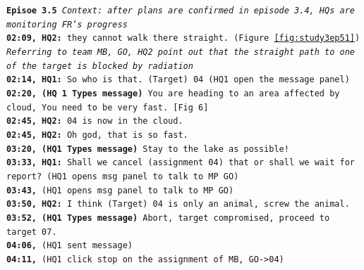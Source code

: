 \noindent\texttt{\textbf{Episoe 3.5}
\emph{Context: after plans are confirmed in episode 3.4, HQs are monitoring FR's progress}\\
\textbf{02:09, HQ2:} they cannot walk there straight. (Figure \ref{fig:study3ep51})\\
\emph{Referring to team MB, GO, HQ2 point out that the straight path to one of the target is blocked by radiation}\\
\textbf{02:14, HQ1:} So who is that. (Target) 04 (HQ1 open the message panel) \\
\textbf{02:20, (HQ 1 Types message)}  You are heading to an area affected by cloud, You need to be very fast. [Fig 6] \\
\textbf{02:45, HQ2:} 04 is now in the cloud. \\
\textbf{02:45, HQ2:} Oh god, that is so fast.\\
\textbf{03:20, (HQ1 Types message)} Stay to the lake as possible!\\
\textbf{03:33, HQ1:} Shall we cancel (assignment 04) that or shall we wait for report? (HQ1 opens msg panel to talk to MP GO)\\
\textbf{03:43,} (HQ1 opens msg panel to talk to MP GO) \\
\textbf{03:50, HQ2:} I think (Target) 04 is only an animal, screw the animal.  \\
\textbf{03:52, (HQ1 Types message)} Abort, target compromised, proceed to target 07. \\
\textbf{04:06, } (HQ1 sent message)\\
\textbf{04:11, } (HQ1 click stop on the assignment of MB, GO->04)\\
}


